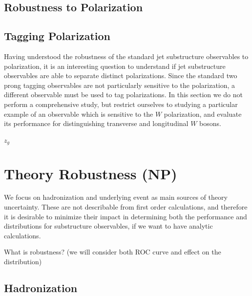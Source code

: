 \documentclass[11pt,letterpaper]{article}
\begin{document}
\subsection{Robustness to Polarization}

\subsection{Tagging Polarization}

Having understood the robustness of the standard jet substructure observables to polarization, it is an interesting question to understand if jet substructure observables are able to separate distinct polarizations. Since the standard two prong tagging observables are not particularly sensitive to the polarization, a different observable must be used to tag polarizations. In this section we do not perform a comprehensive study, but restrict ourselves to studying a particular example of an observable which is sensitive to the $W$ polarization, and evaluate its performance for distinguishing transverse and longitudinal $W$ bosons. 

$z_g$\cite{Larkoski:2014wba}
\cite{Larkoski:2015lea}
\cite{Larkoski:2014bia}

\section{Theory Robustness (NP)}

\cite{Salam:2016yht}




We focus on hadronization and underlying event as main sources of theory uncertainty. These are not describable from first order calculations, and therefore it is desirable to minimize their impact in determining both the performance and distributions for substructure observables, if we want to have analytic calculations.

What is robustness?  (we will consider both ROC curve and effect on the distribution)

\subsection{Hadronization}
\end{document}
